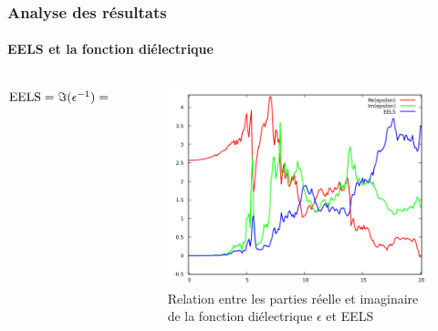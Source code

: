 \documentclass[french]{beamer}
\newcommand{\V}[1]{\textnormal{#1}}
\begin{document}
\begin{frame}
\frametitle{Analyse des résultats}
\framesubtitle{EELS et la fonction diélectrique}
\begin{columns}
  \begin{column}{\paperwidth-10pt}
  $\V{EELS} 
  = \Im{(\epsilon^{-1})} 
  		= \frac{-\Im({\epsilon})}{\Re{(\epsilon)}^2 + \Im{(\epsilon)}^2}$
  \end{column}
  \begin{column}{\paperwidth-10pt}
        \begin{figure}[!h]
      \centering
      \includegraphics[width=8cm]{epsilon_compare}
      \caption{Relation entre les parties réelle et imaginaire de la fonction diélectrique $\epsilon$ et EELS}\label{fig-epsilon_compare}
    \end{figure}
  \end{column}
\end{columns}

\end{frame}
\end{document}
